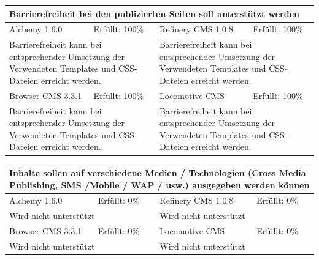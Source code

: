 \begin{tabular}[!ht]{|l|l|l|l|}
\hline
\multicolumn{4}{|p{15cm}|}{\textbf{Barrierefreiheit bei den publizierten Seiten soll unterstützt werden}} \\
\hline
  Alchemy 1.6.0 & \cellcolor{green}Erfüllt: 100\% & Refinery CMS 1.0.8 & \cellcolor{green}Erfüllt: 100\% \\
  \hline
  \multicolumn{2}{|p{7.5cm}|}{Barrierefreiheit kann bei entsprechender Umsetzung der Verwendeten Templates und CSS-Dateien erreicht werden.} & \multicolumn{2}{p{7.5cm}|}{Barrierefreiheit kann bei entsprechender Umsetzung der Verwendeten Templates und CSS-Dateien erreicht werden.} \\
  \hline
  Browser CMS 3.3.1 & \cellcolor{green}Erfüllt: 100\% & Locomotive CMS & \cellcolor{green}Erfüllt: 100\% \\
  \hline
  \multicolumn{2}{|p{7.5cm}|}{Barrierefreiheit kann bei entsprechender Umsetzung der Verwendeten Templates und CSS-Dateien erreicht werden.} & \multicolumn{2}{p{7.5cm}|}{Barrierefreiheit kann bei entsprechender Umsetzung der Verwendeten Templates und CSS-Dateien erreicht werden.} \\
\hline
\end{tabular}
\newline
\newline
\newline
\begin{tabular}[!ht]{|l|l|l|l|}
\hline
\multicolumn{4}{|p{15cm}|}{\textbf{Inhalte sollen auf verschiedene Medien / Technologien (Cross Media Publishing, SMS /Mobile / WAP / usw.) ausgegeben werden können}} \\
\hline
  Alchemy 1.6.0 & \cellcolor{red}Erfüllt: 0\% & Refinery CMS 1.0.8 & \cellcolor{red}Erfüllt: 0\% \\
  \hline
  \multicolumn{2}{|p{7.5cm}|}{Wird nicht unterstützt} & \multicolumn{2}{p{7.5cm}|}{Wird nicht unterstützt} \\
  \hline
  Browser CMS 3.3.1 & \cellcolor{red}Erfüllt: 0\% & Locomotive CMS & \cellcolor{red}Erfüllt: 0\% \\
  \hline
  \multicolumn{2}{|p{7.5cm}|}{Wird nicht unterstützt} & \multicolumn{2}{p{7.5cm}|}{Wird nicht unterstützt} \\
\hline
\end{tabular}
\newline
\newline
\newline
